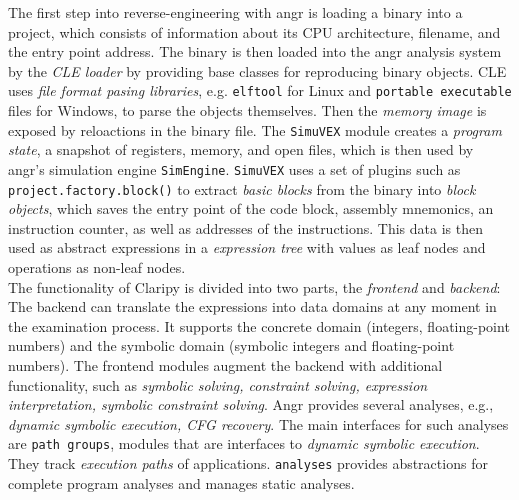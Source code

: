 \documentclass[seminar]{plai}
\begin{document}
The first step into reverse-engineering with angr is loading a binary into a project, which consists of information about its CPU architecture, filename, and the entry point address.\cite{core-concepts} The binary is then loaded into the angr analysis system by the \textit{CLE loader} by providing base classes for reproducing binary objects.
CLE uses \textit{file format pasing libraries}, e.g. \texttt{elftool} for Linux and \texttt{portable executable} files for Windows, to parse the objects themselves.
Then the \textit{memory image} is exposed by reloactions in the binary file.\cite{art-of-war-angr}
The \texttt{SimuVEX} module creates a \textit{program state}, a snapshot of registers, memory, and open files, which is then used by angr's simulation engine \texttt{SimEngine}.
\texttt{SimuVEX} uses a set of plugins such as \texttt{project.factory.block()} to extract \textit{basic blocks} from the binary into \textit{block objects}, which saves the entry point of the code block, assembly mnemonics, an instruction counter, as well as addresses of the instructions.\cite{art-of-war-angr,core-concepts}
This data is then used as abstract expressions in a \textit{expression tree} with values as leaf nodes and operations as non-leaf nodes.\\
The functionality of Claripy is divided into two parts, the \textit{frontend} and \textit{backend}:
The backend can translate the expressions into data domains at any moment in the examination process.  
It supports the concrete domain (integers, floating-point numbers) and the symbolic domain (symbolic integers and floating-point numbers).
The frontend modules augment the backend with additional functionality, such as \textit{symbolic solving, constraint solving, expression interpretation, symbolic constraint solving}.
Angr provides several analyses, e.g., \textit{dynamic symbolic execution, CFG recovery}. The main interfaces for such analyses are \texttt{path groups}, modules that are interfaces to \textit{dynamic symbolic execution}. They track \textit{execution paths} of applications.
\texttt{analyses} provides abstractions for complete program analyses and manages static analyses.
\end{document}
